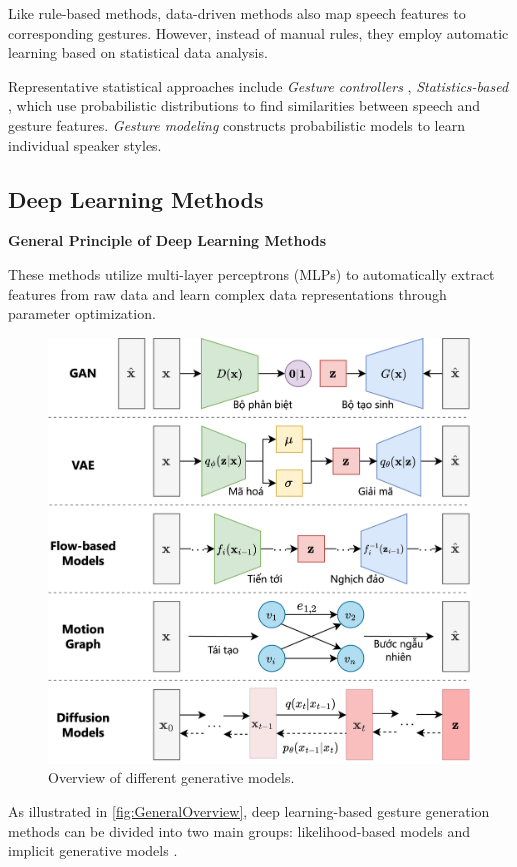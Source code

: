 Like rule-based methods, data-driven methods also map speech features to corresponding gestures. However, instead of manual rules, they employ automatic learning based on statistical data analysis.

Representative statistical approaches include \textit{Gesture controllers} \cite{levine2010gesture}, \textit{Statistics-based} \cite{yang2020statistics}, which use probabilistic distributions to find similarities between speech and gesture features. \textit{Gesture modeling} \cite{neff2008gesture} constructs probabilistic models to learn individual speaker styles.

\subsection{Deep Learning Methods}

\textbf{General Principle of Deep Learning Methods}

These methods utilize multi-layer perceptrons (MLPs) to automatically extract features from raw data and learn complex data representations through parameter optimization.

\begin{figure}[h]
	\centering
	\includegraphics[width=0.8\linewidth]{images/GeneralOverview}
	\caption{Overview of different generative models.}
	\label{fig:GeneralOverview}
\end{figure}

As illustrated in \autoref{fig:GeneralOverview}, deep learning-based gesture generation methods can be divided into two main groups: likelihood-based models and implicit generative models \cite{song2021score}.

